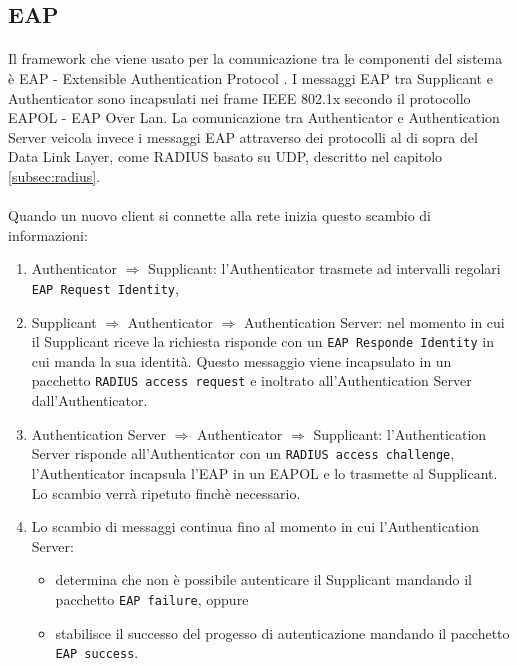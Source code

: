 \subsection{EAP}
\paragraph{} Il framework che viene usato per la comunicazione tra le componenti del sistema è EAP - Extensible Authentication Protocol \cite{rfc2}. I messaggi EAP tra Supplicant e Authenticator sono incapsulati nei frame IEEE 802.1x secondo il protocollo EAPOL - EAP Over Lan. La comunicazione tra Authenticator e Authentication Server veicola invece i messaggi EAP attraverso dei protocolli al di sopra del Data Link Layer, come RADIUS basato su UDP, descritto nel capitolo \ref{subsec:radius}.
\paragraph{} Quando un nuovo client si connette alla rete inizia questo scambio di informazioni:
\begin{enumerate}
	\item Authenticator $\Longrightarrow$ Supplicant: l'Authenticator trasmete ad intervalli regolari {\tt EAP Request Identity}, 
	\item Supplicant $\Longrightarrow$ Authenticator $\Longrightarrow$ Authentication Server: nel momento in cui il Supplicant riceve la richiesta risponde con un {\tt EAP Responde Identity} in cui manda la sua identità. Questo messaggio viene incapsulato in un pacchetto {\tt RADIUS access request} e inoltrato all'Authentication Server dall'Authenticator.
	\item Authentication Server $\Longrightarrow$ Authenticator $\Longrightarrow$ Supplicant: l'Authentication Server risponde all'Authenticator con un {\tt RADIUS access challenge}, l'Authenticator incapsula l'EAP in un EAPOL e lo trasmette al Supplicant. Lo scambio verrà ripetuto finchè necessario.
	\item Lo scambio di messaggi continua fino al momento in cui l'Authentication Server:  
	\begin{itemize}
		\item determina che non è possibile autenticare il Supplicant mandando il pacchetto {\tt EAP failure}, oppure
		\item stabilisce il successo del progesso di autenticazione mandando il pacchetto {\tt EAP success}.
	\end{itemize}
\end{enumerate}


